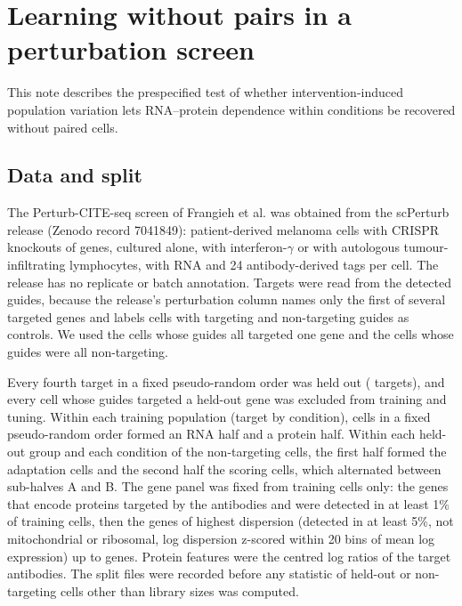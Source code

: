 \section{Learning without pairs in a perturbation screen}\label{sec:pert}
This note describes the prespecified test of whether intervention-induced population
variation lets RNA--protein dependence within conditions be recovered without
paired cells.

\subsection*{Data and split}
The Perturb-CITE-seq screen of Frangieh et al.\cite{frangieh2021} was obtained
from the scPerturb release\cite{peidli2024} (Zenodo record 7041849): \PtCells{} patient-derived melanoma cells
with CRISPR knockouts of \PtTargets{} genes, cultured alone, with interferon-$\gamma$
or with autologous tumour-infiltrating lymphocytes, with RNA and 24
antibody-derived tags per cell. The release has no replicate or batch
annotation. Targets were read from the detected guides, because the release's
perturbation column names only the first of several targeted genes and labels
cells with targeting and non-targeting guides as controls. We used the
\PtSingleCells{} cells whose guides all targeted one gene and the \PtNTCells{}
cells whose guides were all non-targeting.

Every fourth target in a fixed pseudo-random order was held out (\PtHeldTargets{} targets), and
every cell whose guides targeted a held-out gene was excluded from training and
tuning. Within each training population (target by condition), cells in a fixed
pseudo-random order formed an RNA half and a protein half. Within each
held-out group and each condition of the non-targeting cells, the first half
formed the adaptation cells and the second half the scoring cells, which
alternated between sub-halves A and B. The gene panel was fixed from training
cells only: the \PtEncodingGenes{} genes that encode proteins targeted by the
antibodies and were detected in at least 1\% of training cells, then the genes of highest dispersion
(detected in at least 5\%, not mitochondrial or ribosomal, log dispersion
z-scored within 20 bins of mean log expression) up to \PtGenes{} genes. Protein
features were the centred log ratios of the \PtProteins{} target antibodies. The
split files were recorded before any statistic of held-out or
non-targeting cells other than library sizes was computed.

